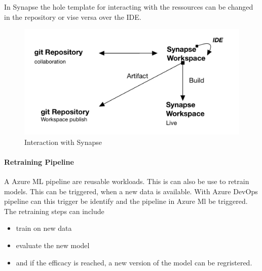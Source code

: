 In Synapse the hole template for interacting with the ressources can be changed in the repository or vise versa over the \gls{IDE}.

\begin{figure}[H]
	\centering
	\includegraphics[scale = 0.3]{attachment/chapter_10/Scc022}
	\caption{Interaction with Synapse}
\end{figure}

\paragraph{Retraining Pipeline}

A Azure ML pipeline are reusable workloads. This is can also be use to retrain models. This can be triggered, when a new data is available. With Azure DevOps pipeline can this trigger be identify and the pipeline in Azure Ml be triggered.\\

The retraining steps can include
\begin{itemize}
	\item train on new data
	\item evaluate the new model
	\item and if the efficacy is reached, a new version of the model can be regristered.
\end{itemize}

